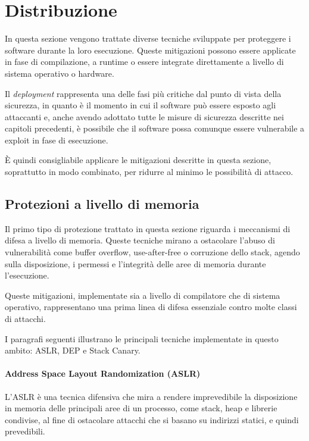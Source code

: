 \section{Distribuzione}
\label{sec:deployment}

In questa sezione vengono trattate diverse tecniche sviluppate per proteggere i software
durante la loro esecuzione. Queste mitigazioni possono essere applicate in fase
di compilazione, a runtime o essere integrate direttamente a livello di sistema operativo
o hardware.

Il \textit{deployment} rappresenta una delle fasi più critiche dal punto di
vista della sicurezza, in quanto è il momento in cui il software può essere esposto
agli attaccanti e, anche avendo adottato tutte le misure di sicurezza descritte
nei capitoli precedenti, è possibile che il software possa comunque essere vulnerabile
a exploit in fase di esecuzione.

È quindi consigliabile applicare le mitigazioni descritte in questa sezione,
soprattutto in modo combinato, per ridurre al minimo le possibilità di attacco.

\subsection{Protezioni a livello di memoria}
\label{sec:memory-protection}

Il primo tipo di protezione trattato in questa sezione riguarda i meccanismi di
difesa a livello di memoria. Queste tecniche mirano a ostacolare l'abuso di vulnerabilità
come buffer overflow, use-after-free o corruzione dello stack, agendo sulla disposizione,
i permessi e l'integrità delle aree di memoria durante l'esecuzione.

Queste mitigazioni, implementate sia a livello di compilatore che di sistema operativo,
rappresentano una prima linea di difesa essenziale contro molte classi di
attacchi.

I paragrafi seguenti illustrano le principali tecniche implementate in questo
ambito: ASLR, DEP e Stack Canary.

\paragraph{Address Space Layout Randomization (ASLR)}
L'ASLR è una tecnica difensiva che mira a rendere imprevedibile la disposizione in
memoria delle principali aree di un processo, come stack, heap e librerie condivise,
al fine di ostacolare attacchi che si basano su indirizzi statici, e quindi prevedibili.

